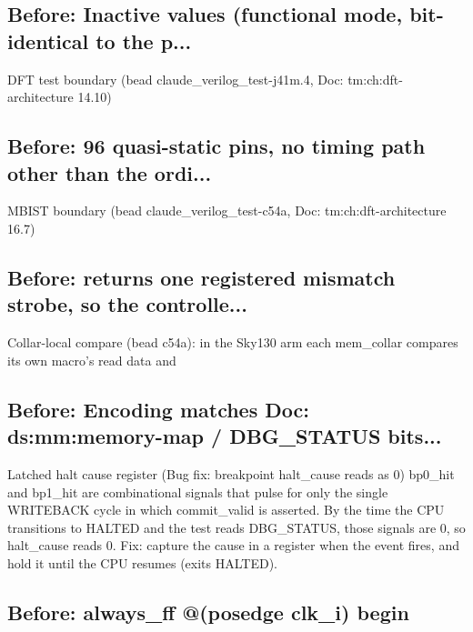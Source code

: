 \begin{record}

\subsection*{Before: Inactive values (functional mode, bit-identical to the p...}

\begin{textblock}
DFT test boundary (bead claude_verilog_test-j41m.4, Doc: tm:ch:dft-architecture 14.10)
\end{textblock}

\subsection*{Before: 96 quasi-static pins, no timing path other than the ordi...}

\begin{textblock}
MBIST boundary (bead claude_verilog_test-c54a, Doc: tm:ch:dft-architecture 16.7)
\end{textblock}

\subsection*{Before: returns one registered mismatch strobe, so the controlle...}

\begin{textblock}
Collar-local compare (bead c54a): in the Sky130 arm each mem_collar compares its own macro's read data and
\end{textblock}

\subsection*{Before: Encoding matches Doc: ds:mm:memory-map / DBG\_STATUS bits...}

\begin{textblock}
Latched halt cause register (Bug fix: breakpoint halt_cause reads as 0)
bp0_hit and bp1_hit are combinational signals that pulse for only the
single WRITEBACK cycle in which commit_valid is asserted.  By the time
the CPU transitions to HALTED and the test reads DBG_STATUS, those
signals are 0, so halt_cause reads 0.
Fix: capture the cause in a register when the event fires, and hold it
until the CPU resumes (exits HALTED).
\end{textblock}

\subsection*{Before: always\_ff @(posedge clk\_i) begin}


\end{record}
